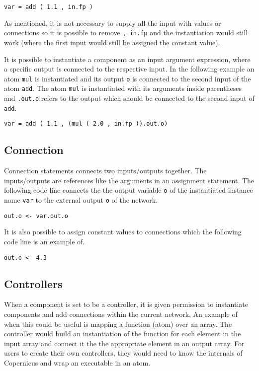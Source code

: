 \begin{verbatim}
var = add ( 1.1 , in.fp )
\end{verbatim}

As mentioned, it is not necessary to supply all the input with values
or connections so it is possible to remove \verb#, in.fp# and the
instantiation would still work (where the first input would still be
assigned the constant value).

It is possible to instantiate a component as an input argument
expression, where a specific output is connected to the respective
input. In the following example an atom \verb#mul# is instantiated and
its output \verb#o# is connected to the second input of the atom
\verb#add#. The atom \verb#mul# is instantiated with its arguments
inside parentheses and \verb#.out.o# refers to the output which should
be connected to the second input of \verb#add#.

\begin{verbatim}
var = add ( 1.1 , (mul ( 2.0 , in.fp )).out.o)
\end{verbatim}

\subsection{Connection}
Connection statements connects two inputs/outputs together. The
inputs/outputs are references like the arguments in an assignment
statement. The following code line connects the the output variable
\verb#o# of the instantiated instance name \verb#var# to the external
output \verb#o# of the network.

\begin{verbatim}
out.o <- var.out.o
\end{verbatim}

It is also possible to assign constant values to connections which the
following code line is an example of.

\begin{verbatim}
out.o <- 4.3
\end{verbatim}

\subsection{Controllers} \label{sec:control}
When a component is set to be a controller, it is given permission to
instantiate components and add connections within the current
network. An example of when this could be useful is mapping a function
(atom) over an array. The controller would build an instantiation of
the function for each element in the input array and connect it the
the appropriate element in an output array. For users to create their
own controllers, they would need to know the internals of Copernicus
and wrap an executable in an atom.

